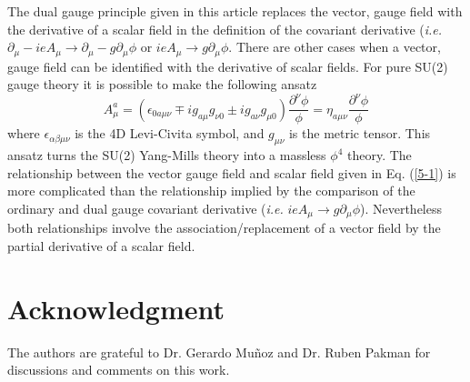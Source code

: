 \documentclass[a4paper,aps]{revtex4}
\begin{document}
The dual gauge principle given in this article replaces
the vector, gauge field with the derivative of a scalar field in
the definition of the covariant derivative ({\it i.e.} $\partial_{\mu}
-ie A_{\mu} \rightarrow \partial _{\mu} -g \partial_{\mu} \phi$ or
$i e A_{\mu} \rightarrow g \partial _{\mu} \phi$. There are other cases
when a vector, gauge field can be identified with the derivative
of scalar fields. For pure SU(2) gauge theory it is possible to
make the following ansatz \cite{corr} \cite{wilc}
\begin{equation}
\label{5-1}
A_{\mu}^a=(\epsilon_{0 a \mu \nu} \mp i g_{a \mu}
g_{\nu 0}\pm i g_{a \nu} g_{\mu 0}) \frac{\partial ^{\nu}
\phi}{\phi}  =\eta _{a\mu \nu} \frac{\partial ^{\nu} \phi}{\phi}
\end{equation}
where $\epsilon_{\alpha \beta \mu \nu}$ is the 4D Levi-Civita
symbol, and $g_{\mu \nu}$ is the metric tensor. 
This ansatz turns the SU(2) Yang-Mills theory into a
massless $\phi ^4$ theory. The
relationship between the vector gauge field and scalar
field given in Eq. (\ref{5-1}) is more complicated than
the relationship implied by the comparison of the ordinary
and dual gauge covariant derivative ({\it i.e.}
$i e A_{\mu} \rightarrow g \partial _{\mu} \phi$).
Nevertheless both relationships involve the association/replacement
of a vector field by the partial derivative of a scalar
field.


\section{Acknowledgment} The authors are grateful to Dr. Gerardo
Mu{\~n}oz and Dr. Ruben Pakman for discussions and comments on
this work.
\end{document}
